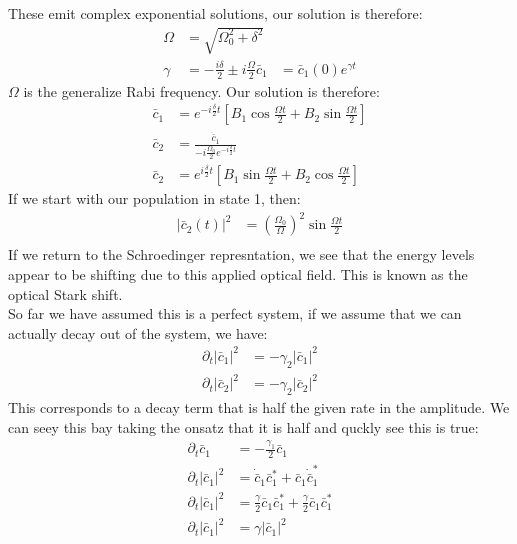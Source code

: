 These emit complex exponential solutions, our solution is therefore:
\begin{align*}
	\Omega &= \sqrt{\Omega_0^2 + \delta^2} \\
	\gamma &= -\frac{i\delta}{2} \pm i\frac{\Omega}{2}
	\bar{c}_1 &= \bar{c}_1(0) e^{\gamma t}
\end{align*}
$\Omega$ is the generalize Rabi frequency. Our solution is therefore:
\begin{align*}
	\bar{c}_1 &= e^{-i\frac{\delta}{2} t} \left[ B_1 \cos \frac{\Omega t}{2} + B_2 \sin \frac{\Omega t}{2}\right] \\
	\bar{c}_2 &= \frac{\dot{\bar{c}}_1}{-i\frac{\Omega_0}{2} e^{-i\frac{\delta}{2} t}} \\
	\bar{c}_2 &= e^{i\frac{\delta}{2} t} \left[ B_1 \sin \frac{\Omega t}{2} + B_2 \cos \frac{\Omega t}{2}\right]
\end{align*}
If we start with our population in state 1, then:
\begin{align*}
	|\bar{c}_2(t)|^2 &= \left(\frac{\Omega_0}{\Omega}\right)^2 \sin \frac{\Omega t}{2} \\
\end{align*}
If we return to the Schroedinger represntation, we see that the energy levels appear to be shifting due to this applied optical field. This is known as the optical Stark shift.\\
So far we have assumed this is a perfect system, if we assume that we can actually decay out of the system, we have:
\begin{align*}
	\partial_t |\bar{c}_1|^2 &= -\gamma_2|\bar{c}_1|^2 \\
	\partial_t |\bar{c}_2|^2 &= -\gamma_2|\bar{c}_2|^2
\end{align*}
This corresponds to a decay term that is half the given rate in the amplitude. We can seey this bay taking the onsatz that it is half and quckly see this is true:
\begin{align*}
	\partial_t \bar{c}_1 &= -\frac{\gamma_1}{2} \bar{c}_1 \\
	\partial_t |\bar{c}_1|^2 &= \dot{\bar{c}}_1\bar{c}_1^* + \bar{c}_1 \dot{\bar{c}}_1^* \\
	\partial_t |\bar{c}_1|^2 &= \frac{\gamma}{2}\bar{c}_1\bar{c}_1^* + \frac{\gamma}{2}\bar{c}_1 \bar{c}_1^* \\
	\partial_t |\bar{c}_1|^2 &= \gamma |\bar{c}_1|^2
\end{align*}
